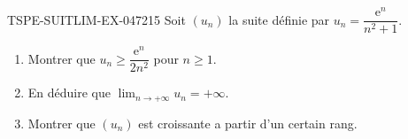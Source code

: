 \begin{exercice}{TSPE-SUITLIM-EX-047}{2}{15}
Soit $(u_n)$ la suite définie par $u_n = \dfrac{\mathrm{e}^n}{n^2 + 1}$.
\begin{enumerate}
  \item Montrer que $u_n \geq \dfrac{\mathrm{e}^n}{2n^2}$ pour $n \geq 1$.
  \item En déduire que $\lim_{n \to +\infty} u_n = +\infty$.
  \item Montrer que $(u_n)$ est croissante a partir d'un certain rang.
\end{enumerate}
\end{exercice}
